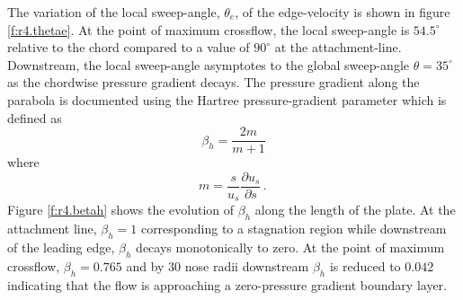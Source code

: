 The variation of the local sweep-angle, $\theta_e$, of the edge-velocity is
shown in figure \ref{f:r4.thetae}.  At the point of maximum crossflow, the
local sweep-angle is $54.5^\circ$ relative to the chord compared to a value of
$90^\circ$ at the attachment-line.  Downstream, the local sweep-angle
asymptotes to the global sweep-angle $\theta=35^\circ$ as the chordwise
pressure gradient decays.  The pressure gradient along the parabola is
documented using the Hartree pressure-gradient parameter which is defined as
%
\begin{equation} \label{e:betah}
  \beta_h = \frac{2 m}{m+1} 
\end{equation}
%
where
%
\begin{equation}
  m = \frac{s}{u_s} \frac{\partial u_s}{\partial s} \period
\end{equation}
%
Figure \ref{f:r4.betah} shows the evolution of $\beta_h$ along the length of
the plate.  At the attachment line, $\beta_h = 1$ corresponding to a
stagnation region while downstream of the leading edge, $\beta_h$ decays
monotonically to zero.  At the point of maximum crossflow, $\beta_h = 0.765$
and by 30 nose radii downstream $\beta_h$ is reduced to $0.042$ indicating
that the flow is approaching a zero-pressure gradient boundary layer.
%
%
%
%
%
%
%
%
%
%
%
%
%
%


